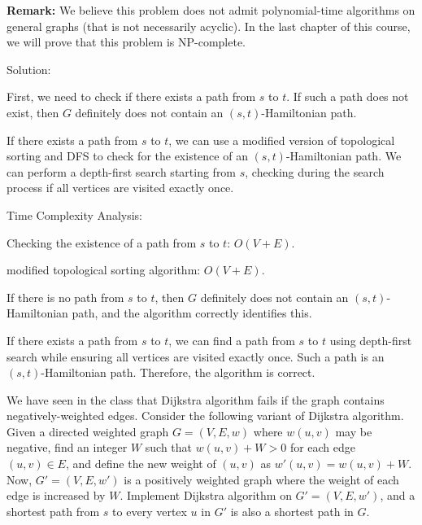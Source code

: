 \documentclass{oxmathproblems}
\begin{document}
\begin{questions}
\noindent\textbf{Remark: }We believe this problem does not admit polynomial-time algorithms on general graphs (that is not necessarily acyclic). In the last chapter of this course, we will prove that this problem is NP-complete.

Solution:

First, we need to check if there exists a path from $s$ to $t$. If such a path does not exist, then $G$ definitely does not contain an $(s,t)$-Hamiltonian path.

If there exists a path from $s$ to $t$, we can use a modified version of topological sorting and DFS to check for the existence of an $(s,t)$-Hamiltonian path. We can perform a depth-first search starting from $s$, checking during the search process if all vertices are visited exactly once.

Time Complexity Analysis:

Checking the existence of a path from $s$ to $t$: $O(V+E)$.

modified topological sorting algorithm: $O(V+E)$.

If there is no path from $s$ to $t$, then $G$ definitely does not contain an $(s,t)$-Hamiltonian path, and the algorithm correctly identifies this.

If there exists a path from $s$ to $t$, we can find a path from $s$ to $t$ using depth-first search while ensuring all vertices are visited exactly once. Such a path is an $(s,t)$-Hamiltonian path. Therefore, the algorithm is correct.

\miquestion[25] 
We have seen in the class that Dijkstra algorithm fails if the graph contains negatively-weighted edges.
Consider the following variant of Dijkstra algorithm.
Given a directed weighted graph $G=(V,E,w)
$ where $w(u,v)$ may be negative, find an integer $W$ such that $w(u,v)+W>0$ for each edge $(u,v)\in E$, and define the new weight of $(u,v)$ as $w'(u,v)=w(u,v)+W$.
Now, $G'=(V,E,w')$ is a positively weighted graph where the weight of each edge is increased by $W$.
Implement Dijkstra algorithm on $G'=(V,E,w')$, and a shortest path from $s$ to every vertex $u$ in $G'$ is also a shortest path in $G$.

\end{questions}
\end{document}
